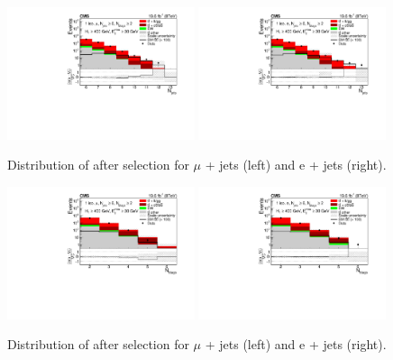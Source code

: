 \begin{figure}[ht!]
\centering
    \includegraphics[width=0.49\textwidth]{images/Run1/figures/NbOfSelectedJets_mu.pdf}
     \includegraphics[width=0.49\textwidth]{images/Run1/figures/NbOfSelectedJets_e.pdf}       
    \caption{Distribution of \njets after selection for $\mu$ + jets (left) and e + jets (right).}
    \label{fig:datasimnjets}
\end{figure}

\begin{figure}[ht!]
\centering
    \includegraphics[width=0.49\textwidth]{images/Run1/figures/NbOfSelectedBJets_mu.pdf}
     \includegraphics[width=0.49\textwidth]{images/Run1/figures/NbOfSelectedBJets_e.pdf}        
    \caption{Distribution of \nbtags after selection for $\mu$ + jets (left) and e + jets (right).}
    \label{fig:datasimnbtags}
\end{figure}

